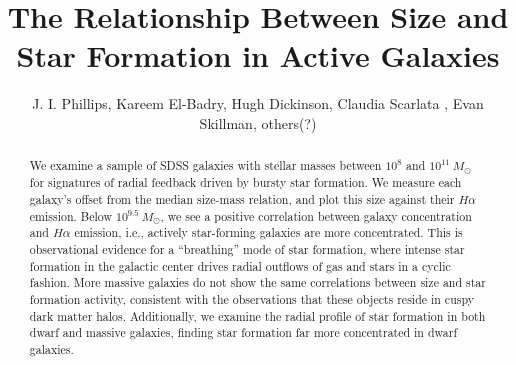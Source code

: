 \documentclass[iop]{emulateapj}
\begin{document}

\title{The Relationship Between Size and Star Formation in Active Galaxies}


\author{J. I. Phillips, Kareem El-Badry, Hugh Dickinson,  Claudia Scarlata , Evan Skillman, others(?)}




\begin{abstract}
We examine a sample of SDSS galaxies with stellar masses between $10^{8}$ and $10^{11} \ M_{\odot}$ for signatures of radial feedback driven by bursty star formation. We measure each galaxy's offset from the median size-mass relation, and plot this size against their $H\alpha$ emission. Below $10^{9.5}\ M_{\odot}$, we see a positive correlation between galaxy concentration and $H\alpha$ emission, i.e., actively star-forming galaxies are more concentrated. This is observational evidence for a ``breathing'' mode of star formation, where intense star formation in the galactic center drives radial outflows of gas and stars in a cyclic fashion. More massive galaxies do not show the same correlations between size and star formation activity, consistent with the observations that these objects reside in cuspy dark matter halos. Additionally, we examine the radial profile of star formation in both dwarf and massive galaxies, finding star formation far more concentrated in dwarf galaxies.
\end{abstract}
\end{document}
